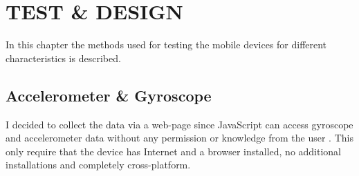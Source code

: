 \chapter{TEST \& DESIGN}\label{cha:test}
In this chapter the methods used for testing the mobile devices for different characteristics is described. 

\section{Accelerometer \& Gyroscope}\label{sec:test:motion}
I decided to collect the data via a web-page since JavaScript can access gyroscope and accelerometer data without any permission or knowledge from the user \cite{sensor:DeviceOrientation:spec}. This only require that the device has Internet and a browser installed, no additional installations and completely cross-platform. \\
